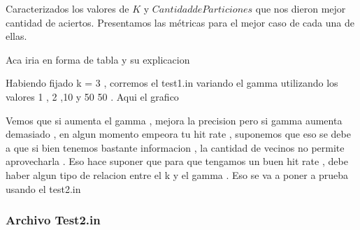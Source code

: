 Caracterizados los valores de $K$ y $Cantidad de Particiones$ que nos dieron mejor cantidad de aciertos. Presentamos las métricas para el mejor caso de cada una de ellas.

Aca iria en forma de tabla y su explicacion



Habiendo fijado k = 3 , corremos el test1.in variando el gamma utilizando los valores 1 , 2 ,10 y 50 50 . Aqui el grafico

Vemos que si aumenta el gamma , mejora la precision pero si gamma aumenta demasiado , en algun momento empeora tu hit rate , suponemos que eso se debe a que si bien tenemos bastante informacion , la cantidad de vecinos no permite aprovecharla . Eso hace suponer que para que tengamos un buen hit rate , debe haber algun tipo de relacion entre el k y el gamma . Eso se va a poner a prueba usando el test2.in

\subsubsection {Archivo Test2.in}





